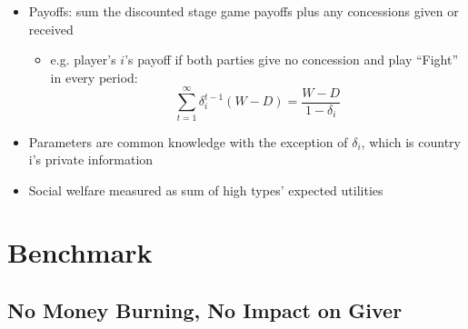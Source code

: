 \documentclass{beamer}
\newcommand{\de}{\delta}
\begin{document}

\begin{frame}
\begin{itemize}[<+->]
	\item Payoffs: sum the discounted stage game payoffs plus any concessions given or received
		\begin{itemize}
			\item e.g. player's $i$'s payoff if both parties give no concession and play ``Fight'' in every period: $$\sum_{t=1}^\infty \de_i^{t-1} (W-D) = \frac{W-D}{1-\de_i}$$
		\end{itemize}
	\item Parameters are common knowledge with the exception of $\delta_i$, which is country i's private information
	\item Social welfare measured as sum of high types' expected utilities
\end{itemize}
\end{frame}


\section{Benchmark}
\subsection{No Money Burning, No Impact on Giver}
\end{document}
